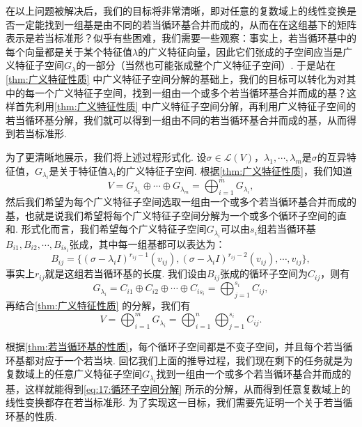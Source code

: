 在以上问题被解决后，我们的目标将非常清晰，即对任意的复数域上的线性变换是否一定能找到一组基是由不同的若当循环基合并而成的，从而在在这组基下的矩阵表示是若当标准形？似乎有些困难，我们需要一些观察：事实上，若当循环基中的每个向量都是关于某个特征值$\lambda$的广义特征向量，因此它们张成的子空间应当是广义特征子空间$G_\lambda$的一部分（当然也可能张成整个广义特征子空间）. 于是站在\autoref{thm:广义特征性质} 中广义特征子空间分解的基础上，我们的目标可以转化为对其中的每一个广义特征子空间，找到一组由一个或多个若当循环基合并而成的基？这样首先利用\autoref{thm:广义特征性质} 中广义特征子空间分解，再利用广义特征子空间的若当循环基分解，我们就可以得到一组由不同的若当循环基合并而成的基，从而得到若当标准形.

为了更清晰地展示，我们将上述过程形式化. 设$\sigma\in\mathcal{L}(V)$，$\lambda_1,\cdots,\lambda_m$是$\sigma$的互异特征值，$G_{\lambda_i}$是关于特征值$\lambda_i$的广义特征子空间. 根据\autoref{thm:广义特征性质}，我们知道
\[V=G_{\lambda_1}\oplus\cdots\oplus G_{\lambda_m}=\bigoplus_{i=1}^m G_{\lambda_i},\]
然后我们希望为每个广义特征子空间选取一组由一个或多个若当循环基合并而成的基，也就是说我们希望将每个广义特征子空间分解为一个或多个循环子空间的直和. 形式化而言，我们希望每个广义特征子空间$G_{\lambda_i}$可以由$s_i$组若当循环基$B_{i1},B_{i2},\cdots,B_{is_i}$张成，其中每一组基都可以表达为：
\[B_{ij}=\{(\sigma-\lambda_iI)^{r_{ij}-1}(v_{ij}),(\sigma-\lambda_iI)^{r_{ij}-2}(v_{ij}),\cdots,v_{ij}\},\]
事实上$r_{ij}$就是这组若当循环基的长度. 我们设由$B_{ij}$张成的循环子空间为$C_{ij}$，则有
\[G_{\lambda_i}=C_{i1}\oplus C_{i2}\oplus\cdots\oplus C_{is_i}=\bigoplus_{j=1}^{s_i} C_{ij},\]
再结合\autoref{thm:广义特征性质} 的分解，我们有
\begin{equation} \label{eq:17:循环子空间分解}
    V=\bigoplus_{i=1}^m G_{\lambda_i}=\bigoplus_{i=1}^n\bigoplus_{j=1}^{s_i} C_{ij}.
\end{equation}

根据\autoref{thm:若当循环基的性质}，每个循环子空间都是不变子空间，并且每个若当循环基都对应于一个若当块. 回忆我们上面的推导过程，我们现在剩下的任务就是为复数域上的任意广义特征子空间$G_{\lambda_i}$找到一组由一个或多个若当循环基合并而成的基，这样就能得到\autoref{eq:17:循环子空间分解} 所示的分解，从而得到任意复数域上的线性变换都存在若当标准形. 为了实现这一目标，我们需要先证明一个关于若当循环基的性质.

